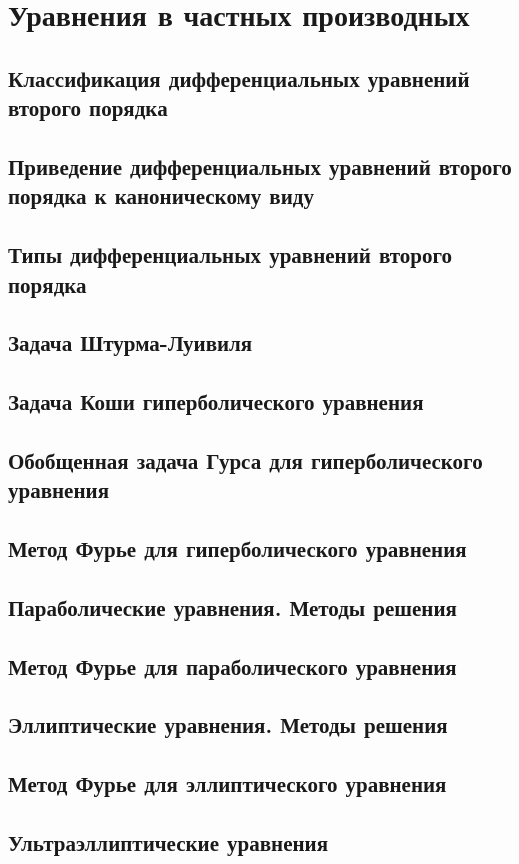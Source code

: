\chapter{Уравнения в частных производных}

%

\begin{multicols}{2}
    \raggedcolumns
    \section{Классификация дифференциальных уравнений второго порядка}
    \section{Приведение дифференциальных уравнений второго порядка к каноническому виду}
    \section{Типы дифференциальных уравнений второго порядка}
    \section{Задача Штурма-Луивиля}
    \section{Задача Коши гиперболического уравнения}
    \section{Обобщенная задача Гурса для гиперболического уравнения}
    \section{Метод Фурье для гиперболического уравнения}
    \section{Параболические уравнения. Методы решения}
    \section{Метод Фурье для параболического уравнения}
    \section{Эллиптические уравнения. Методы решения}
    \section{Метод Фурье для эллиптического уравнения}
    \section{Ультраэллиптические уравнения}
\end{multicols}
